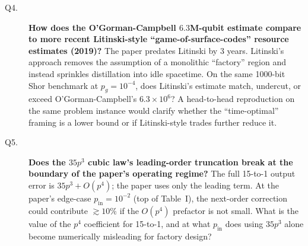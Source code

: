 \begin{description}
\item[Q4.] \textbf{How does the O'Gorman-Campbell $6.3$M-qubit estimate
compare to more recent Litinski-style ``game-of-surface-codes'' resource
estimates (2019)?} The paper predates Litinski by 3 years. Litinski's
approach removes the assumption of a monolithic ``factory'' region and
instead sprinkles distillation into idle spacetime. On the same
1000-bit Shor benchmark at $p_g=10^{-4}$, does Litinski's estimate
match, undercut, or exceed O'Gorman-Campbell's $6.3\times 10^{6}$? A
head-to-head reproduction on the same problem instance would clarify
whether the ``time-optimal'' framing is a lower bound or if
Litinski-style trades further reduce it.

\item[Q5.] \textbf{Does the $35 p^{3}$ cubic law's leading-order
truncation break at the boundary of the paper's operating regime?}
The full 15-to-1 output error is $35 p^{3} + O(p^{4})$; the paper
uses only the leading term. At the paper's edge-case
$p_{\text{in}}=10^{-2}$ (top of Table~I), the next-order correction
could contribute $\gtrsim 10\%$ if the $O(p^{4})$ prefactor is not
small. What is the value of the $p^{4}$ coefficient for 15-to-1, and
at what $p_{\text{in}}$ does using $35p^3$ alone become numerically
misleading for factory design?

\end{description}
